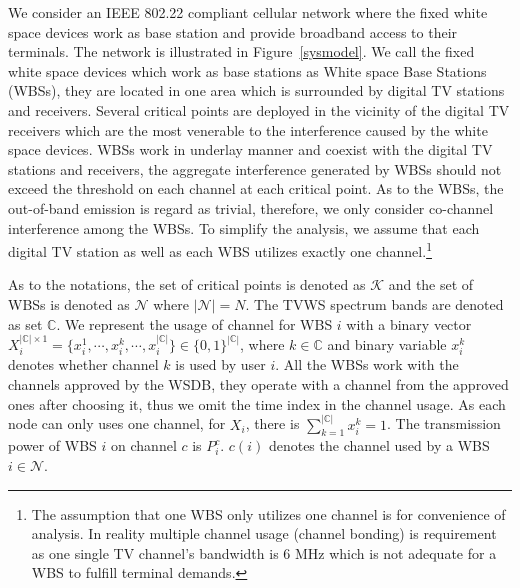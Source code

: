 \documentclass[times]{ettauth}
\theoremstyle{mytheoremstyle}
\theoremstyle{mytheoremstyle}
\theoremstyle{mytheoremstyle}
\begin{document}
We consider an IEEE 802.22 compliant cellular network where the fixed white space devices work as base station and provide broadband access to their terminals.
The network is illustrated in Figure~\ref{sysmodel}.
We call the fixed white space devices which work as base stations as White space Base Stations (WBSs), they are located in one area which is surrounded by digital TV stations and receivers.
Several critical points are deployed in the vicinity of the digital TV receivers which are the most venerable to the interference caused by the white space devices.
WBSs work in underlay manner and coexist with the digital TV stations and receivers, the aggregate interference generated by WBSs should not exceed the threshold on each channel at each critical point.
%
As to the WBSs, the out-of-band emission is regard as trivial, therefore, we only consider co-channel interference among the WBSs.
To simplify the analysis, we assume that each digital TV station as well as each WBS utilizes exactly one channel.\footnote{The assumption that one WBS only utilizes one channel is for convenience of analysis. In reality multiple channel usage (channel bonding) is requirement as one single TV channel's bandwidth is 6 MHz which is not adequate for a WBS to fulfill terminal demands. 
}
%

As to the notations, the set of critical points is denoted as $\mathcal{K}$ and the set of WBSs is denoted as $\mathcal{N}$ where $|\mathcal{N}|=N$. 
The TVWS spectrum bands are denoted as set $\mathbb{C}$.
We represent the usage of channel for WBS $i$ with a binary vector $X_i^{|\mathbb{C}|\times 1}=\{x_i^1,\cdots, x_i^k,\cdots, x_i^{|\mathbb{C}|}\}\in \{0,1\}^{|\mathbb{C}|}$, where $k\in \mathbb{C}$ and binary variable $x_i^k$ denotes whether channel $k$ is used by user $i$. 
All the WBSs work with the channels approved by the WSDB, they operate with a channel from the approved ones after choosing it, thus we omit the time index in the channel usage.
As each node can only uses one channel, for $X_i$, there is $\sum_{k=1}^{|\mathbb{C}|}x_i^k=1$. 
The transmission power of WBS $i$ on channel $c$ is $P_i^c$.
$c(i)$ denotes the channel used by a WBS $i\in \mathcal{N}$. 
\end{document}
